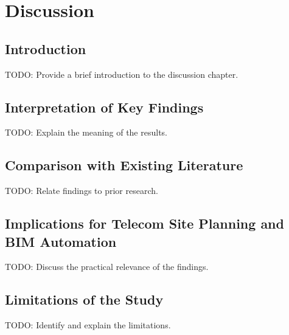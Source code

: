\chapter{Discussion}
\label{sec:discussion}


\section{Introduction}
TODO: Provide a brief introduction to the discussion chapter.

\section{Interpretation of Key Findings}
TODO: Explain the meaning of the results.

\section{Comparison with Existing Literature}
TODO: Relate findings to prior research.

\section{Implications for Telecom Site Planning and BIM Automation}
TODO: Discuss the practical relevance of the findings.

\section{Limitations of the Study}
TODO: Identify and explain the limitations.

